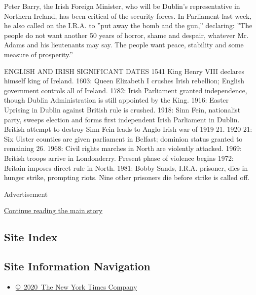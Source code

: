 Peter Barry, the Irish Foreign Minister, who will be Dublin's
representative in Northern Ireland, has been critical of the security
forces. In Parliament last week, he also called on the I.R.A. to ''put
away the bomb and the gun,'' declaring: ''The people do not want another
50 years of horror, shame and despair, whatever Mr. Adams and his
lieutenants may say. The people want peace, stability and some measure
of prosperity.''

ENGLISH AND IRISH SIGNIFICANT DATES 1541 King Henry VIII declares
himself king of Ireland. 1603: Queen Elizabeth I crushes Irish
rebellion; English government controls all of Ireland. 1782: Irish
Parliament granted independence, though Dublin Administration is still
appointed by the King. 1916: Easter Uprising in Dublin against British
rule is crushed. 1918: Sinn Fein, nationalist party, sweeps election and
forms first independent Irish Parliament in Dublin. British attempt to
destroy Sinn Fein leads to Anglo-Irish war of 1919-21. 1920-21: Six
Ulster counties are given parliament in Belfast; dominion status granted
to remaining 26. 1968: Civil rights marches in North are violently
attacked. 1969: British troops arrive in Londonderry. Present phase of
violence begins 1972: Britain imposes direct rule in North. 1981: Bobby
Sands, I.R.A. prisoner, dies in hunger strike, prompting riots. Nine
other prisoners die before strike is called off.

Advertisement

\protect\hyperlink{after-bottom}{Continue reading the main story}

\hypertarget{site-index}{%
\subsection{Site Index}\label{site-index}}

\hypertarget{site-information-navigation}{%
\subsection{Site Information
Navigation}\label{site-information-navigation}}

\begin{itemize}
\tightlist
\item
  \href{https://help.nytimes.com/hc/en-us/articles/115014792127-Copyright-notice}{©~2020~The
  New York Times Company}
\end{itemize}

